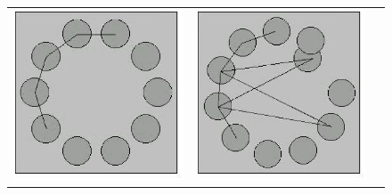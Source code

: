 \begin{figure}
\begin{tabular}{lll}
\includegraphics[angle=0,scale=0.3]{heatavi1.eps}
&
\includegraphics[angle=0,scale=0.3]{heatavi2.eps}

\end{tabular}
\end{figure}

